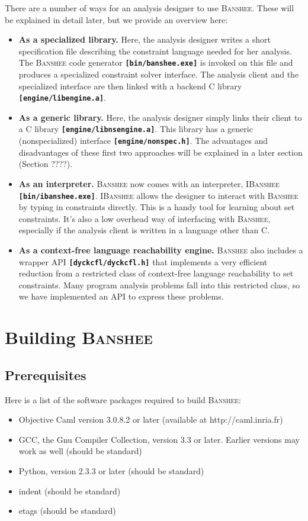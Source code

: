 \documentclass{article}
\newcommand{\banshee}{\textsc{Banshee}}
\newcommand{\ibanshee}{\textsc{IBanshee}}
\newcommand{\file}[1]{\texttt{\textbf{[#1]}}}
\begin{document}
There are a number of ways for an analysis designer to use
\banshee{}. These will be explained in detail later, but we provide an
overview here:
\begin{itemize}
\item \textbf{As a specialized library.} Here, the analysis designer
  writes a short specification file describing the constraint language
  needed for her analysis. The \banshee{} code generator
  \file{bin/banshee.exe} is invoked on this file and produces a specialized
  constraint solver interface. The analysis client and the specialized
  interface are then linked with a backend C library
  \file{engine/libengine.a}.
\item \textbf{As a generic library.} Here, the analysis designer
  simply links their client to a C library
  \file{engine/libnsengine.a}. This library has a generic
  (nonspecialized) interface \file{engine/nonspec.h}. The advantages
  and disadvantages of these first two approaches will be explained in
  a later section (Section ????).
\item \textbf{As an interpreter.} \banshee{} now comes with an
  interpreter, \ibanshee{} \file{bin/ibanshee.exe}. \ibanshee{} allows
  the designer to interact with \banshee{} by typing in constraints
  directly. This is a handy tool for learning about set
  constraints. It's also a low overhead way of interfacing with
  \banshee{}, especially if the analysis client is written in a
  language other than C.
\item \textbf{As a context-free language reachability engine.}
  \banshee{} also includes a wrapper API \file{dyckcfl/dyckcfl.h} that
  implements a very efficient reduction from a restricted class of
  context-free language reachability to set constraints. Many program
  analysis problems fall into this restricted class, so we have
  implemented an API to express these problems.
\end{itemize}

\section{Building \banshee{}}

\subsection{Prerequisites}
Here is a list of the software packages required to build \banshee{}:

\begin{itemize}
\item Objective Caml version 3.0.8.2 or later (available at
  http://caml.inria.fr)
\item GCC, the Gnu Compiler Collection, version 3.3 or later. Earlier
  versions may work as well (should be standard)
\item Python, version 2.3.3 or later (should be standard)
\item indent (should be standard)
\item etags (should be standard)
\end{itemize}
\end{document}
